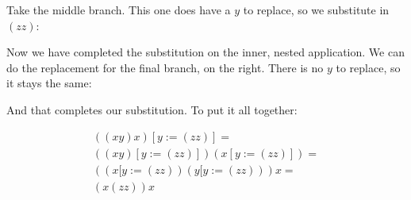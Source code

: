 \documentclass{book}
\numberwithin{equation}{chapter}
\begin{document}
\noindent
Take the middle branch. This one does have a $y$ to replace, so we substitute in $(z z)$:

\begin{center}
\end{center}

\noindent
Now we have completed the substitution on the inner, nested application. We can do the replacement for the final branch, on the right. There is no $y$ to replace, so it stays the same:

\begin{center}
\end{center}

\noindent
And that completes our substitution. To put it all together:

\begin{align}
((x y) x)[y := (z z)] = \\
((x y)[y := (z z)])(x[y := (z z)]) = \\
((x[y := (z z))(y[y := (z z)))x = \\
(x (z z)) x
\end{align}


\end{document}
